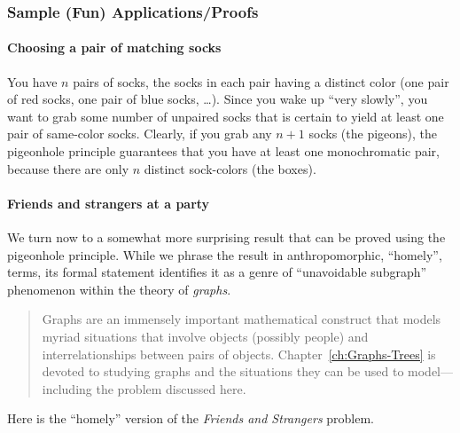 \subsubsection{Sample (Fun) Applications/Proofs}
\label{sec:pigeon-apps}


\paragraph{\small\sf Choosing a pair of matching socks} 

You have $n$ pairs of socks, the socks in each pair having a distinct
color (one pair of red socks, one pair of blue socks, \ldots).  Since
you wake up ``very slowly'', you want to grab some number of unpaired
socks that is certain to yield at least one pair of same-color socks.
Clearly, if you grab any $n+1$ socks (the pigeons), the pigeonhole
principle guarantees that you have at least one monochromatic pair,
because there are only $n$ distinct sock-colors (the boxes).



\paragraph{\small\sf Friends and strangers at a party}

We turn now to a somewhat more surprising result that can be proved
using the pigeonhole principle.  While we phrase the result in
anthropomorphic, ``homely'', terms, its formal statement identifies it
as a genre of ``unavoidable subgraph''
%
phenomenon within the theory of {\it graphs}.
\begin{quote}
Graphs are an immensely important mathematical construct that models
myriad situations that involve objects (possibly people) and
interrelationships between pairs of objects.
Chapter~\ref{ch:Graphs-Trees} is devoted to studying graphs and the
situations they can be used to model---including the problem discussed
here.
\end{quote}
Here is the ``homely'' version of the {\it Friends and Strangers} problem.

